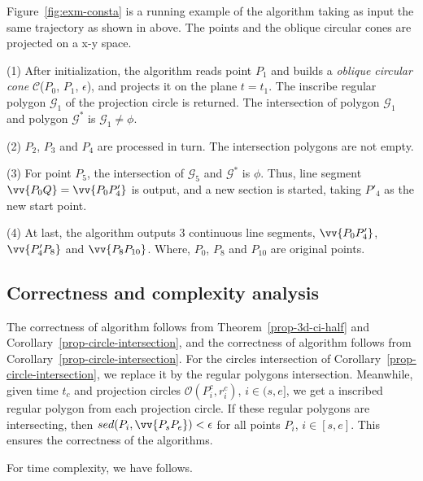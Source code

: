\begin{example}
\label{exm-alg-conesta}
Figure~\ref{fig:exm-consta} is a running example of the \cista algorithm taking as input the same trajectory as shown in above.
The points and the oblique circular cones are projected on a x-y space.

\ni (1) After initialization, the \cista algorithm reads point $P_1$ and builds a \emph{oblique circular cone} $\mathcal{C}$($P_0$, $P_{1}$, $\epsilon$), and projects it on the plane $t=t_1$. The inscribe regular polygon $\mathcal{G}_1$ of the projection circle is returned. The intersection of polygon $\mathcal{G}_1$ and polygon $\mathcal{G}^*$ is $\mathcal{G}_1 \ne \phi$.

\ni (2) $P_2$, $P_3$ and $P_4$ are processed in turn. The intersection polygons are not empty.

\ni (3) For point $P_5$, the intersection of $\mathcal{G}_5$ and $\mathcal{G}^*$ is $\phi$. Thus, line segment $\vv{P_0Q} =\vv{P_0P'_4}$ is output, and a new section is started, taking $P'_4$ as the new start point.

\ni (4) At last, the algorithm outputs 3 continuous line segments, \ie $\vv{P_0P'_4}$, $\vv{P'_4P_8}$ and $\vv{P_8P_{10}}$. Where, $P_0$, $P_8$ and $P_{10}$ are original points.
\end{example}






\subsection{Correctness and complexity analysis}

The correctness of algorithm \cist follows from Theorem~\ref{prop-3d-ci-half} and Corollary~\ref{prop-circle-intersection}, and the correctness of algorithm \cista follows from Corollary~\ref{prop-circle-intersection}. For the circles intersection of Corollary~\ref{prop-circle-intersection}, we replace it by the regular polygons intersection.
Meanwhile, given time $t_c$ and projection circles $\mathcal{O}(P^c_i, r^c_i)$, $i \in (s, e]$, we get a inscribed regular polygon from each projection circle.
If these regular polygons are intersecting, then $sed(P_i, \vv{P_sP_e})<\epsilon$ for all points $P_i$, $i \in [s,e]$.
This ensures the correctness of the algorithms.


For time complexity, we have follows.





